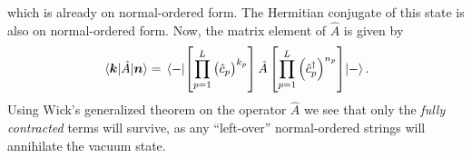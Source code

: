             which is already on normal-ordered form.
            The Hermitian conjugate of this state is also on normal-ordered
            form.
            Now, the matrix element of $\hat{A}$ is given by
            \begin{align}
                \mel{\boldsymbol{k}}{\hat{A}}{\boldsymbol{n}}
                = \mel{-}{
                    \left[ 
                        \prod_{p = 1}^{L}
                        \left( \hat{c}_{p} \right)^{k_p}
                     \right]
                    \hat{A}
                    \left[ 
                        \prod_{p = 1}^{L}\left( 
                            \hat{c}_{p}^{\dagger}
                         \right)^{n_p}
                     \right]
                }{-}.
            \end{align}
            Using Wick's generalized theorem on the operator $\hat{A}$ we see
            that only the \emph{fully contracted} terms will survive, as any
            ``left-over'' normal-ordered strings will annihilate the vacuum
            state.


